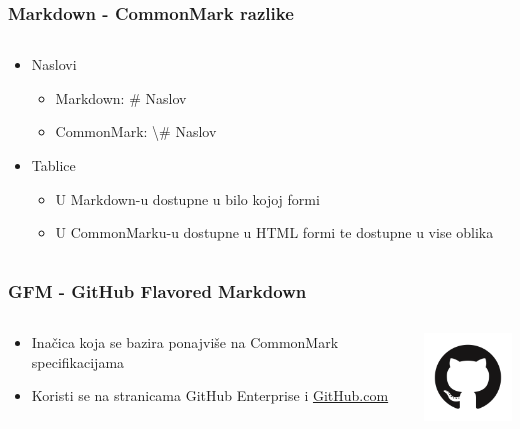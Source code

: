 \documentclass{beamer}
\begin{document}
\begin{frame}
	\frametitle{Markdown - CommonMark razlike}

 	\begin{minipage}[0.2\textheight]{\textwidth}
 	\begin{columns}[T]
 	\begin{column}{0.8\textwidth}
 	\begin{itemize}
 		\item{Naslovi
 		\begin{itemize}
 			\item{Markdown: \# Naslov}
 			\item{CommonMark: \textbackslash \# Naslov}
 		\end{itemize}}
 		\item{Tablice
 		\begin{itemize}
 			\item{U Markdown-u dostupne u bilo kojoj formi}
 			\item{U CommonMarku-u dostupne u HTML formi te dostupne u vise oblika}
 		\end{itemize}}
	\end{itemize}
	\end{column}
	\end{columns}
	\end{minipage}

\end{frame}





\begin{frame}
	\frametitle{GFM - GitHub Flavored Markdown}

 	\begin{minipage}[0.2\textheight]{\textwidth}
 	\begin{columns}[T]
 	\begin{column}{0.8\textwidth}
 	\begin{itemize}
		\item{Inačica koja se bazira ponajviše na CommonMark specifikacijama}
		\item{Koristi se na stranicama GitHub Enterprise i \href{https://github.com/}{GitHub.com}}
	\end{itemize}
	\end{column}
	\begin{column}{0.2\textwidth}
	\includegraphics[width=2.5cm]{Slike/githublogo.png}
	\end{column}
	\end{columns}
	\end{minipage}

\end{frame}
\end{document}
